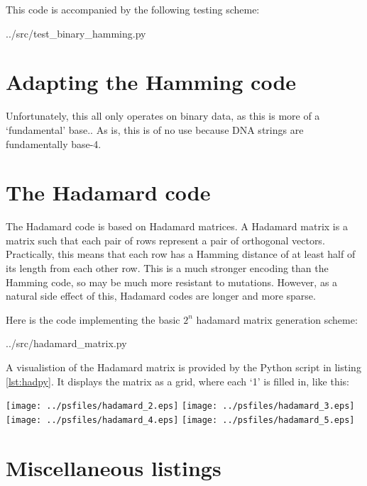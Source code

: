 \documentclass{article}
\begin{document}
    This code is accompanied by the following testing scheme:


{../src/test_binary_hamming.py}

    \section{Adapting the Hamming code}

    Unfortunately, this all only operates on binary data, as this is more of a
    `fundamental' base.. As is, this is of no use because DNA strings are
    fundamentally base-4.

    \section{The Hadamard code}


    The Hadamard code is based on Hadamard matrices. A Hadamard matrix is a
    matrix such that each pair of rows represent a pair of orthogonal vectors.
    Practically, this means that each row has a Hamming distance of at least
    half of its length from each other row. This is a much stronger encoding
    than the Hamming code, so may be much more resistant to mutations. However,
    as a natural side effect of this, Hadamard codes are longer and more sparse.

    Here is the code implementing the basic $2^n$ hadamard matrix generation
    scheme:


{../src/hadamard_matrix.py}



    A visualistion of the Hadamard matrix is provided by the Python script in
    listing \ref{lst:hadpy}. It displays the matrix as a grid, where each `1' is
    filled in, like this:

\begin{center}
\texttt{[image: ../psfiles/hadamard\_2.eps]}%
\hfill%
\texttt{[image: ../psfiles/hadamard\_3.eps]}%
\hfill%
\texttt{[image: ../psfiles/hadamard\_4.eps]}%
\hfill%
\texttt{[image: ../psfiles/hadamard\_5.eps]}%
\end{center}

    \section{Miscellaneous listings}
\end{document}
